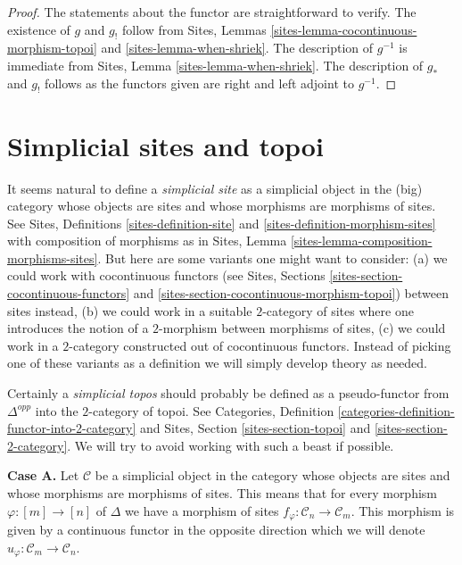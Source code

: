 \documentclass{stacks-project}
\theoremstyle{plain}
\theoremstyle{definition}
\theoremstyle{remark}
\numberwithin{equation}{subsection}
\begin{document}
\begin{proof}
The statements about the functor are straightforward to verify.
The existence of $g$ and $g_!$ follow from
Sites, Lemmas \ref{sites-lemma-cocontinuous-morphism-topoi} and
\ref{sites-lemma-when-shriek}. The description of
$g^{-1}$ is immediate from Sites, Lemma \ref{sites-lemma-when-shriek}.
The description of $g_*$ and $g_!$ follows as the functors given are
right and left adjoint to $g^{-1}$.
\end{proof}








\section{Simplicial sites and topoi}
\label{section-simplicial-sites}

\noindent
It seems natural to define a {\it simplicial site} as a simplicial
object in the (big) category whose objects are sites
and whose morphisms are morphisms of sites.
See Sites, Definitions \ref{sites-definition-site} and
\ref{sites-definition-morphism-sites}
with composition of morphisms as in 
Sites, Lemma \ref{sites-lemma-composition-morphisms-sites}.
But here are some variants one might want to consider:
(a) we could work with cocontinuous functors
(see Sites, Sections \ref{sites-section-cocontinuous-functors} and
\ref{sites-section-cocontinuous-morphism-topoi}) between sites instead,
(b) we could work in a suitable $2$-category of sites where one introduces
the notion of a $2$-morphism between morphisms of sites,
(c) we could work in a $2$-category constructed out of cocontinuous
functors. Instead of picking one of these variants as a definition
we will simply develop theory as needed.

\medskip\noindent
Certainly a {\it simplicial topos} should probably be defined as a
pseudo-functor from $\Delta^{opp}$ into the $2$-category of topoi.
See Categories, Definition \ref{categories-definition-functor-into-2-category}
and Sites, Section \ref{sites-section-topoi} and
\ref{sites-section-2-category}. We will try to avoid working with such
a beast if possible.

\medskip\noindent
{\bf Case A.}
Let $\mathcal{C}$ be a simplicial object in the category whose objects
are sites and whose morphisms are morphisms of sites. This means that
for every morphism $\varphi : [m] \to [n]$ of $\Delta$ we have a morphism
of sites $f_\varphi : \mathcal{C}_n \to \mathcal{C}_m$. This morphism is
given by a continuous functor in the opposite direction which we will denote
$u_\varphi : \mathcal{C}_m \to \mathcal{C}_n$.
\end{document}
